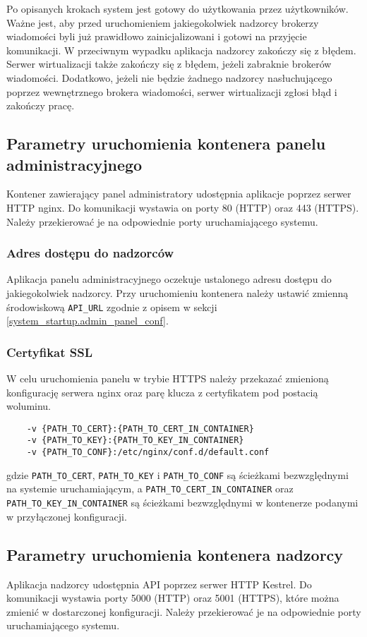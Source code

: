 \documentclass[../opis-rozwiazania.tex]{subfiles}
\begin{document}
Po opisanych krokach system jest gotowy do użytkowania przez użytkowników.
Ważne jest, aby przed uruchomieniem jakiegokolwiek nadzorcy brokerzy wiadomości byli już prawidłowo zainicjalizowani i gotowi na przyjęcie komunikacji.
W przeciwnym wypadku aplikacja nadzorcy zakończy się z błędem.
Serwer wirtualizacji także zakończy się z błędem, jeżeli zabraknie brokerów wiadomości.
Dodatkowo, jeżeli nie będzie żadnego nadzorcy nasłuchującego poprzez wewnętrznego brokera wiadomości, serwer wirtualizacji zgłosi błąd i zakończy pracę.

\subsection{Parametry uruchomienia kontenera panelu administracyjnego}
Kontener zawierający panel administratory udostępnia aplikacje poprzez serwer HTTP nginx.
Do komunikacji wystawia on porty 80 (HTTP) oraz 443 (HTTPS).
Należy przekierować je na odpowiednie porty uruchamiającego systemu.

\subsubsection{Adres dostępu do nadzorców}
Aplikacja panelu administracyjnego oczekuje ustalonego adresu dostępu do jakiegokolwiek nadzorcy.
Przy uruchomieniu kontenera należy ustawić zmienną środowiskową \texttt{API\_URL} zgodnie z opisem w sekcji \ref{system_startup.admin_panel_conf}.

\subsubsection{Certyfikat SSL}
W celu uruchomienia panelu w trybie HTTPS należy przekazać zmienioną konfigurację serwera nginx oraz parę klucza z certyfikatem pod postacią woluminu.
\begin{verbatim}
	-v {PATH_TO_CERT}:{PATH_TO_CERT_IN_CONTAINER}
	-v {PATH_TO_KEY}:{PATH_TO_KEY_IN_CONTAINER}
	-v {PATH_TO_CONF}:/etc/nginx/conf.d/default.conf
\end{verbatim}
gdzie \texttt{PATH\_TO\_CERT}, \texttt{PATH\_TO\_KEY} i \texttt{PATH\_TO\_CONF} są ścieżkami bezwzględnymi na systemie uruchamiającym, a \texttt{PATH\_TO\_CERT\_IN\_CONTAINER} oraz \texttt{PATH\_TO\_KEY\_IN\_CONTAINER} są ścieżkami bezwzględnymi w kontenerze podanymi w przyłączonej konfiguracji.

\subsection{Parametry uruchomienia kontenera nadzorcy}
Aplikacja nadzorcy udostępnia API poprzez serwer HTTP Kestrel.
Do komunikacji wystawia porty 5000 (HTTP) oraz 5001 (HTTPS), które można zmienić w dostarczonej konfiguracji.
Należy przekierować je na odpowiednie porty uruchamiającego systemu.
\end{document}
